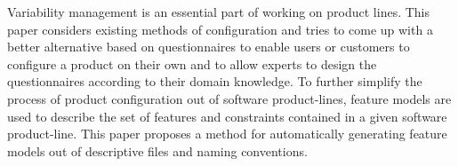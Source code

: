 Variability management is an essential part of working on product lines.
This paper considers existing methods of configuration and tries to come up with a better alternative based on questionnaires to enable users or customers to configure a product on their own and to allow experts to design the questionnaires according to their domain knowledge.
To further simplify the process of product configuration out of software product-lines, feature models are used to describe the set of features and constraints contained in a given software product-line. This paper proposes a method for automatically generating feature models out of descriptive files and naming conventions.